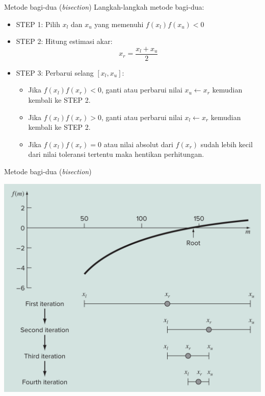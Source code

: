 \begin{frame}{Metode bagi-dua (\textit{bisection})}
Langkah-langkah metode bagi-dua:
\begin{itemize}\tightlist
\item STEP 1: Pilih $x_l$ dan $x_u$ yang memenuhi $f(x_l) f(x_u) < 0$
\item STEP 2: Hitung estimasi akar:
  \begin{equation*}
  x_r = \frac{x_l + x_u}{2}
  \end{equation*} 
\item STEP 3: Perbarui selang $[x_l, x_u]$:
  \begin{itemize}
  \item Jika $f(x_l) f(x_r) < 0$, ganti atau perbarui nilai $x_u \leftarrow x_r$
    kemudian kembali ke STEP 2.
  \item Jika $f(x_l) f(x_r) > 0$, ganti atau perbarui nilai $x_l \leftarrow x_r$
    kemudian kembali ke STEP 2.
  \item Jika $f(x_l) f(x_r) = 0$ atau nilai absolut dari $f(x_r)$ sudah lebih kecil
    dari nilai toleransi tertentu maka hentikan perhitungan.
  \end{itemize}
\end{itemize}

\end{frame}


\begin{frame}{Metode bagi-dua (\textit{bisection})}

{\centering
\includegraphics[height=0.8\textheight]{../chapra_python/Chapra_Fig_5_5.png}
\par}

\end{frame}


